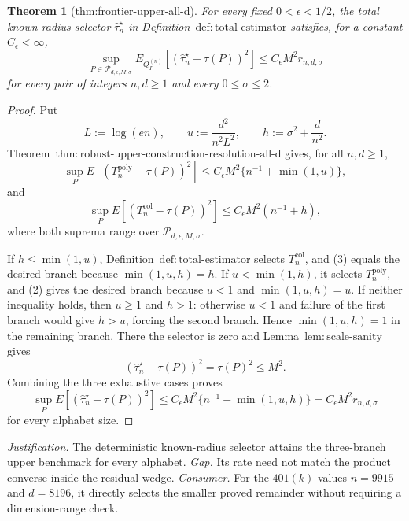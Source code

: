 \documentclass{article}
\newtheorem{theorem}{Theorem}
\begin{document}
\begin{theorem}[thm:frontier-upper-all-d]\label{thm:frontier-upper-all-d}
For every fixed \(0<\epsilon<1/2\), the total known-radius selector \(\widehat\tau_n^{\star}\) in Definition~\(\mathrm{def:total\text{-}estimator}\) satisfies, for a constant \(C_{\epsilon}<\infty\),
\[
 \sup_{P\in\mathcal P_{d,\epsilon,M,\sigma}}
 E_{Q_P^{(n)}}[(\widehat\tau_n^{\star}-\tau(P))^2]
 \le C_{\epsilon}M^2r_{n,d,\sigma}
\]
for every pair of integers \(n,d\ge1\) and every \(0\le\sigma\le2\).
\end{theorem}
\begin{proof}
Put
\[
 L:=\log(en),\qquad u:=\frac{d^2}{n^2L^2},
 \qquad h:=\sigma^2+\frac d{n^2}.
\tag{1}
\]
Theorem~\(\mathrm{thm:robust\text{-}upper\text{-}construction\text{-}resolution\text{-}all\text{-}d}\) gives, for all \(n,d\ge1\),
\[
 \sup_P E[(T_n^{\mathrm{poly}}-\tau(P))^2]
 \le C_{\epsilon}M^2\{n^{-1}+\min(1,u)\},
\tag{2}
\]
and
\[
 \sup_P E[(T_n^{\mathrm{col}}-\tau(P))^2]
 \le C_{\epsilon}M^2(n^{-1}+h),
\tag{3}
\]
where both suprema range over \(\mathcal P_{d,\epsilon,M,\sigma}\).

If \(h\le\min(1,u)\), Definition~\(\mathrm{def:total\text{-}estimator}\) selects \(T_n^{\mathrm{col}}\), and (3) equals the desired branch because \(\min(1,u,h)=h\).  If \(u<\min(1,h)\), it selects \(T_n^{\mathrm{poly}}\), and (2) gives the desired branch because \(u<1\) and \(\min(1,u,h)=u\).  If neither inequality holds, then \(u\ge1\) and \(h>1\): otherwise \(u<1\) and failure of the first branch would give \(h>u\), forcing the second branch.  Hence \(\min(1,u,h)=1\) in the remaining branch.  There the selector is zero and Lemma~\(\mathrm{lem:scale\text{-}sanity}\) gives
\[
 (\widehat\tau_n^{\star}-\tau(P))^2=\tau(P)^2\le M^2.
\tag{4}
\]
Combining the three exhaustive cases proves
\[
 \sup_P E[(\widehat\tau_n^{\star}-\tau(P))^2]
 \le C_{\epsilon}M^2\{n^{-1}+\min(1,u,h)\}
 =C_{\epsilon}M^2r_{n,d,\sigma}
\tag{5}
\]
for every alphabet size.
\end{proof}
\par\smallskip\noindent \textit{Justification.} The deterministic known-radius selector attains the three-branch upper benchmark for every alphabet. \textit{Gap.} Its rate need not match the product converse inside the residual wedge. \textit{Consumer.} For the \(401(k)\) values \(n=9915\) and \(d=8196\), it directly selects the smaller proved remainder without requiring a dimension-range check.
\end{document}
